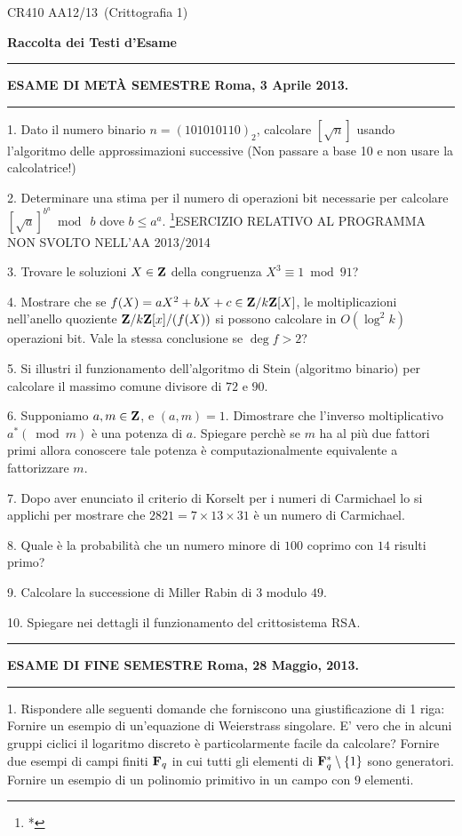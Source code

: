 \centerline{CR410 AA12/13\ (Crittografia 1)}\bigskip
\centerline{\bf Raccolta dei Testi d'Esame}
\bigskip

\bigskip\hrule\bigskip
\centerline{{\bf ESAME DI MET\`{A} SEMESTRE \hfill Roma, 3 Aprile 2013.}} \bigskip\hrule\bigskip

\item{1.} Dato il numero binario 
$n=(101010110)_2$, calcolare  $[\sqrt{n}]$  usando l'algoritmo  
delle approssimazioni successive (Non passare a base 10 e  non
usare la calcolatrice!) 
\item{2.} Determinare una stima per il numero di operazioni bit necessarie per cal\-co\-la\-re\break $[\sqrt{a}]^{b^a}\bmod~b$ dove
$b\leq a^a$. \footnote{*}{ESERCIZIO RELATIVO AL PROGRAMMA NON SVOLTO NELL'AA 2013/2014} 
\item{3.} Trovare le soluzioni $X\in{\bf Z}$ della congruenza $X^3\equiv 1\bmod 91$?
\item{4.} Mostrare che se $f(X)=aX^2+bX+c\in{\bf Z}/k{\bf Z}[X]$, le moltiplicazioni nell'anello quoziente ${\bf Z}/k{\bf Z}[x]/(f(X))$ 
si possono calcolare in $O(\log^2 k)$ operazioni bit. Vale la stessa conclusione se $\deg f>2$?
\item{5.} Si illustri il funzionamento dell'algoritmo di Stein (algoritmo binario) per calcolare il massimo comune divisore
di $72$ e $90$.
\item{6.} Supponiamo $a, m\in{\bf Z}$, e $(a,m)=1$. Dimostrare che l'inverso moltiplicativo $a^*(\bmod m)$ \`e una potenza 
di $a$. Spiegare perch\`e se $m$ ha al pi\`u due fattori primi allora conoscere tale potenza \`e computazionalmente equivalente
a fattorizzare $m$.
\item{7.} Dopo aver enunciato il criterio di Korselt per i numeri di Carmichael lo si applichi per mostrare che
$2821=7\times 13\times 31$ \`e un numero di Carmichael.
\item{8.} Quale è la probabilità che un numero minore di $100$ coprimo con $14$ risulti primo?
\item{9.} Calcolare la successione di Miller Rabin di $3$ modulo $49$.
\item{10.} Spiegare nei dettagli il funzionamento del crittosistema RSA.

\bigskip

\bigskip\hrule\bigskip
\centerline{{\bf ESAME DI FINE SEMESTRE \hfill Roma, 28 Maggio, 2013.}}\bigskip\hrule\bigskip
  
\item{1.} Rispondere alle seguenti domande che forniscono una giustificazione di 1 riga:
 Fornire un esempio di un'equazione di Weierstrass singolare.
 E' vero che in alcuni gruppi ciclici il logaritmo discreto \`e particolarmente
facile da calcolare?
 Fornire due esempi di campi finiti ${\bf F}_q$ in cui tutti gli elementi di ${\bf F}_q^*\setminus\{1\}$
sono generatori.
 Fornire un esempio di un polinomio primitivo in un campo con $9$ elementi.

